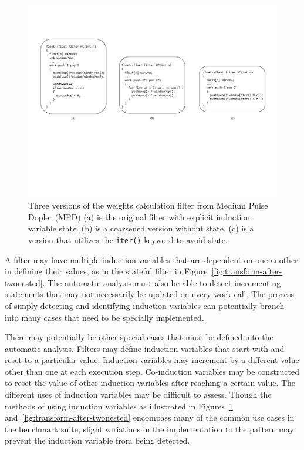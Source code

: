 \begin{figure}[t!]
\centering
\includegraphics[width=6.5in]{figures/weights-calc-example.pdf}
\caption{Three versions of the weights calculation filter from Medium Pulse Dopler (MPD) (a) is the original filter with explicit induction variable state.  (b) is a coarsened version without state. (c) is a version that utilizes the {\tt iter()} keyword to avoid state.\protect\label{fig:wc-example}}
\end{figure}


A filter may have multiple induction variables that are dependent on
one another in defining their values, as in the stateful filter in
Figure~\ref{fig:transform-after-twonested}. The automatic analysis
must also be able to detect incrementing statements that may not
necessarily be updated on every work call. The process of simply
detecting and identifying induction variables can potentially branch
into many cases that need to be specially implemented.

There may potentially be other special cases that must be defined into the automatic analysis.  Filters may define induction variables that start with and reset to a particular value.  Induction variables may increment by a different value other than one at each execution step.  Co-induction variables may be constructed to reset the value of other induction variables after reaching a certain value.  The different uses of induction variables may be difficult to assess.  Though the methods of using induction variables as illustrated in Figures~\ref{fig:wc-example} and~\ref{fig:transform-after-twonested} encompass many of the common use cases in the benchmark suite, slight variations in the implementation to the pattern may prevent the induction variable from being detected.

